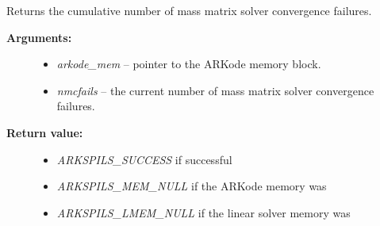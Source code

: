 \documentclass[letterpaper,10pt,english]{sphinxmanual}
\begin{document}
\begin{fulllineitems}
\label{c_interface/User_callable:c.ARKSpilsGetNumMassConvFails}
Returns the cumulative number of mass matrix solver convergence failures.
\begin{description}
\item[{\textbf{Arguments:}}] \leavevmode\begin{itemize}
\item {} 
\emph{arkode\_mem} -- pointer to the ARKode memory block.

\item {} 
\emph{nmcfails} -- the current number of mass matrix solver convergence failures.

\end{itemize}

\item[{\textbf{Return value:}}] \leavevmode\begin{itemize}
\item {} 
\emph{ARKSPILS\_SUCCESS} if successful

\item {} 
\emph{ARKSPILS\_MEM\_NULL} if the ARKode memory was 

\item {} 
\emph{ARKSPILS\_LMEM\_NULL} if the linear solver memory was 

\end{itemize}

\end{description}

\end{fulllineitems}

\end{document}
